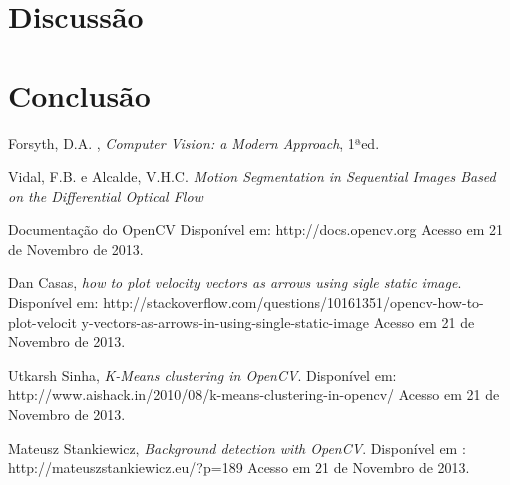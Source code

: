 \documentclass[journal]{IEEEtran}
\begin{document}
\section{Discussão}



\section{Conclusão}

\begin{thebibliography}{1}

Forsyth, D.A. , \emph{Computer Vision: a Modern Approach}, 1ªed.

  Vidal, F.B. e Alcalde, V.H.C. \emph{Motion Segmentation in 
Sequential 
  Images Based on the Differential Optical Flow} 

 Documentação do OpenCV
 Disponível em: http://docs.opencv.org
	 Acesso em 21 de Novembro de 2013.

    Dan Casas, \emph{how to plot velocity vectors as arrows using
                       sigle static image}.
    Disponível em: 
http://stackoverflow.com/questions/10161351/opencv-how-to-plot-velocit
y-vectors-as-arrows-in-using-single-static-image
    Acesso em 21 de Novembro de 2013.

    Utkarsh Sinha, \emph{K-Means clustering in OpenCV}.
    Disponível em: 
http://www.aishack.in/2010/08/k-means-clustering-in-opencv/
    Acesso em 21 de Novembro de 2013.

    Mateusz Stankiewicz, \emph{Background detection with OpenCV}.
    Disponível em : http://mateuszstankiewicz.eu/?p=189
    Acesso em 21 de Novembro de 2013. 
\end{thebibliography}
\end{document}
